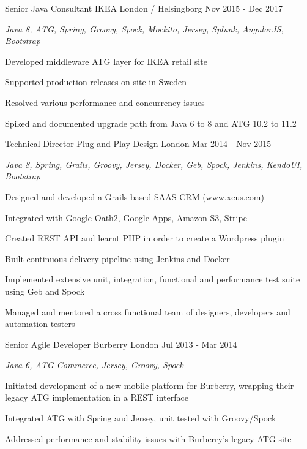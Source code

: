 \begin{cventries}
  \cventry
    {Senior Java Consultant} %
    {IKEA} %
    {London / Helsingborg} %
    {Nov 2015 - Dec 2017} %
    {
      \begin{cvitems} %
        \item {\itshape{Java 8, ATG, Spring, Groovy, Spock, Mockito, Jersey, Splunk, AngularJS, Bootstrap}}
        \item {Developed middleware ATG layer for IKEA retail site}
        \item {Supported production releases on site in Sweden}
        \item {Resolved various performance and concurrency issues}
        \item {Spiked and documented upgrade path from Java 6 to 8 and ATG 10.2 to 11.2}
      \end{cvitems}
    }

  \cventry
    {Technical Director} %
    {Plug and Play Design} %
    {London} %
    {Mar 2014 - Nov 2015} %
    {
      \begin{cvitems} %
        \item {\itshape{Java 8, Spring, Grails, Groovy, Jersey, Docker, Geb, Spock, Jenkins, KendoUI, Bootstrap}}
        \item {Designed and developed a Grails-based SAAS CRM (www.xeus.com)}
        \item {Integrated with Google Oath2, Google Apps, Amazon S3, Stripe}
        \item {Created REST API and learnt PHP in order to create a Wordpress plugin}
        \item {Built continuous delivery pipeline using Jenkins and Docker}
        \item {Implemented extensive unit, integration, functional and performance test suite using Geb and Spock}
        \item {Managed and mentored a cross functional team of designers, developers and automation testers}
      \end{cvitems}
    }

  \cventry
    {Senior Agile Developer} %
    {Burberry} %
    {London} %
    {Jul 2013 - Mar 2014} %
    {
      \begin{cvitems} %
        \item {\itshape{Java 6, ATG Commerce, Jersey, Groovy, Spock}}
        \item {Initiated development of a new mobile platform for Burberry, wrapping their legacy ATG implementation in a REST interface}
        \item {Integrated ATG with Spring and Jersey, unit tested with Groovy/Spock}
        \item {Addressed performance and stability issues with Burberry’s legacy ATG site}
      \end{cvitems}
    }


\end{cventries}
